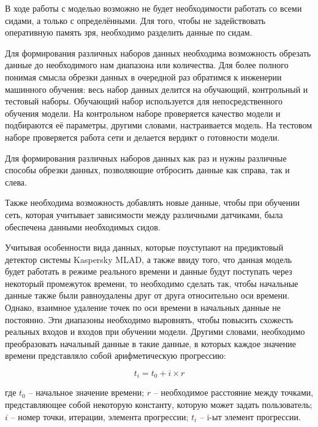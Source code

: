 {  \par \redline В ходе работы с моделью возможно не будет необходимости работать со всеми сидами, а только с определёнными. Для того, чтобы не задействовать оперативную память зря, необходимо разделить данные по сидам.   

  \par \redline Для формирования различных наборов данных необходима возможность обрезать данные до необходимого нам диапазона или количества. Для более полного понимая смысла обрезки данных в очередной раз обратимся к инженерии машинного обучения: весь набор данных делится на обучающий, контрольный и тестовый наборы. Обучающий набор используется для непосредственного обучения модели. На контрольном наборе проверяется качество модели и подбираются её параметры, другими словами, настраивается модель. На тестовом наборе проверяется работа сети и делается вердикт о готовности модели. 

  \par \redline Для формирования различных наборов данных как раз и нужны различные способы обрезки данных, позволяющие отбросить данные как справа, так и слева. 
 
  \par \redline Также необходима возможность добавлять новые данные, чтобы при обучении сеть, которая учитывает зависимости между различными датчиками, была обеспечена данными необходимых сидов.  

  \par \redline Учитывая особенности вида данных, которые поуступают на предиктовый детектор системы Kaspersky MLAD, а также ввиду того, что данная модель будет работать в режиме реального времени и данные будут поступать через некоторый промежуток времени, то необходимо сделать так, чтобы начальные данные также были равноудалены друг от друга относительно оси времени. Однако, взаимное удаление точек по оси времени в начальных данные не постоянно. Эти диапазоны необходимо выровнять, чтобы повысить схожесть реальных входов и входов при обучении модели. Другими словами, необходимо преобразовать начальный данные в такие данные, в которых каждое значение времени представляло собой арифметическую прогрессию:

  \[t_i = t_0 + i \times r\]

  где $t_0$ {--} начальное значение времени; $r$ {--} необходимое расстояние между точками, представляющее собой некоторую константу, которую может задать пользователь; $i$ 
  {--} номер точки, итерации, элемента прогрессии; $t_i$ {--} i-ыт элемент прогрессии. 

}
